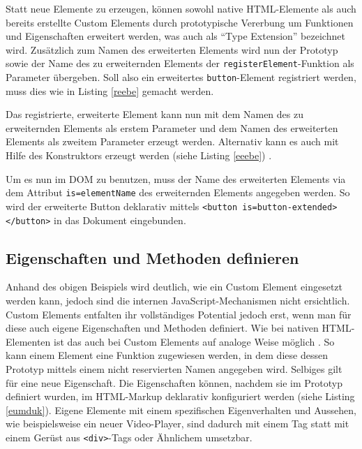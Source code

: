 Statt neue Elemente zu erzeugen, können sowohl native \ac{HTML}-Elemente als auch bereits erstellte Custom Elements durch prototypische Vererbung um Funktionen und Eigenschaften erweitert werden, was auch als ``Type Extension'' bezeichnet wird. Zusätzlich zum Namen des erweiterten Elements wird nun der Prototyp sowie der Name des zu erweiternden Elements der \texttt{registerElement}-Funktion als Parameter übergeben. Soll also ein erweitertes \texttt{button}-Element registriert werden, muss dies wie in Listing \ref{reebe} gemacht werden.



Das registrierte, erweiterte Element kann nun mit dem Namen des zu erweiternden Elements als erstem Parameter und dem Namen des erweiterten Elements als zweitem Parameter erzeugt werden. Alternativ kann es auch mit Hilfe des Konstruktors erzeugt werden (siehe Listing \ref{eeebe}) \cite{citeulike:13752379}.



Um es nun im \ac{DOM} zu benutzen, muss der Name des erweiterten Elements via dem Attribut \texttt{is=\dq elementName\dq} des erweiternden Elements angegeben werden. So wird der erweiterte Button deklarativ mittels \texttt{\textless{}button\ is=\dq button-extended\dq\textgreater{}\textless{}/button\textgreater{}} in das Dokument eingebunden.


\subsection{Eigenschaften und Methoden definieren}\label{eigenschaften-und-methoden-definieren}

Anhand des obigen Beispiels wird deutlich, wie ein Custom Element eingesetzt werden kann, jedoch sind die internen JavaScript-Mechanismen nicht ersichtlich. Custom Elements entfalten ihr vollständiges Potential jedoch erst, wenn man für diese auch eigene Eigenschaften und Methoden definiert. Wie bei nativen \ac{HTML}-Elementen ist das auch bei Custom Elements auf analoge Weise möglich \cite[S. 127-138]{citeulike:13844975}. So kann einem Element eine Funktion zugewiesen werden, in dem diese dessen Prototyp mittels einem nicht reservierten Namen angegeben wird. Selbiges gilt für eine neue Eigenschaft. Die Eigenschaften können, nachdem sie im Prototyp definiert wurden, im \ac{HTML}-Markup deklarativ konfiguriert werden (siehe Listing \ref{eumduk}). Eigene Elemente mit einem spezifischen Eigenverhalten und Aussehen, wie beispielsweise ein neuer Video-Player, sind dadurch mit einem Tag statt mit einem Gerüst aus \texttt{\textless{}div\textgreater{}}-Tags oder Ähnlichem umsetzbar.

